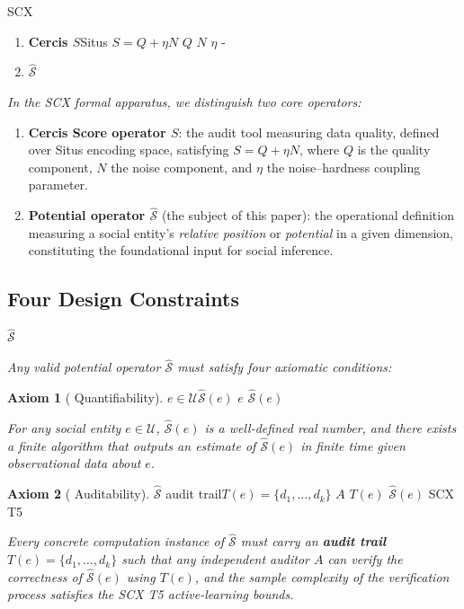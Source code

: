 \documentclass[11pt,a4paper]{article}
\theoremstyle{definition}
\newtheorem{axiom}{ Axiom}[section]
\newcommand{\Sop}{\hat{\mathcal{S}}}
\newcommand{\universe}{\mathcal{U}}
\begin{document}
\bigskip
SCX

\begin{enumerate}[leftmargin=*,label=\textbf{(\arabic*)}]
    \item \textbf{Cercis $S$}Situs
     $S = Q + \eta N$ $Q$ $N$ $\eta$ -
    
    \item \textbf{ $\Sop$}
    \textit{}\textit{}
\end{enumerate}

\noindent\textit{In the SCX formal apparatus, we distinguish two core operators:}

\begin{enumerate}[leftmargin=*,label=\textbf{(\arabic*)}]
    \item \textbf{Cercis Score operator $S$}: the audit tool measuring data quality, defined over Situs encoding space, satisfying $S = Q + \eta N$, where $Q$ is the quality component, $N$ the noise component, and $\eta$ the noise--hardness coupling parameter.
    
    \item \textbf{Potential operator $\Sop$} (the subject of this paper): the operational definition measuring a social entity's \textit{relative position} or \textit{potential} in a given dimension, constituting the foundational input for social inference.
\end{enumerate}

\subsection{ Four Design Constraints}

 $\Sop$ 

\medskip
\noindent\textit{Any valid potential operator $\Sop$ must satisfy four axiomatic conditions:}

\begin{axiom}[ Quantifiability] \label{ax:quant}
 $e \in \universe$$\Sop(e)$ 
 $e$  $\Sop(e)$ 

\medskip
\noindent\textit{For any social entity $e \in \universe$, $\Sop(e)$ is a well-defined real number, and there exists a finite algorithm that outputs an estimate of $\Sop(e)$ in finite time given observational data about $e$.}
\end{axiom}

\begin{axiom}[ Auditability] \label{ax:audit}
$\Sop$ \textbf{}audit trail$T(e) = \{d_1, \ldots, d_k\}$
 $A$  $T(e)$  $\Sop(e)$ 
SCX T5

\medskip
\noindent\textit{Every concrete computation instance of $\Sop$ must carry an \textbf{audit trail} $T(e) = \{d_1, \ldots, d_k\}$ such that any independent auditor $A$ can verify the correctness of $\Sop(e)$ using $T(e)$, and the sample complexity of the verification process satisfies the SCX T5 active-learning bounds.}
\end{axiom}
\end{document}
